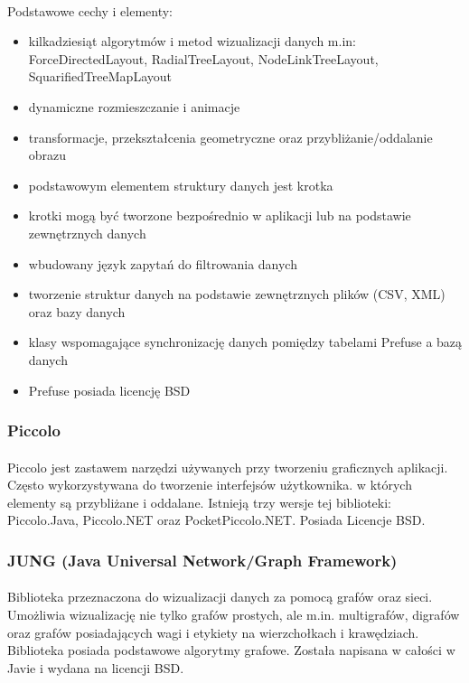 \documentclass[a4paper,10pt]{article}
\begin{document}
\paragraph{}Podstawowe cechy i elementy:
\begin{itemize}
\item kilkadziesiąt algorytmów i metod wizualizacji danych m.in: ForceDirectedLayout, RadialTreeLayout, NodeLinkTreeLayout, SquarifiedTreeMapLayout 
\item dynamiczne rozmieszczanie i animacje 
\item transformacje, przekształcenia geometryczne oraz przybliżanie/oddalanie obrazu 
\item podstawowym elementem struktury danych jest krotka 
\item krotki mogą być tworzone bezpośrednio w aplikacji lub na podstawie zewnętrznych danych
\item wbudowany język zapytań do filtrowania danych 
\item tworzenie struktur danych na podstawie zewnętrznych plików (CSV, XML) oraz bazy danych
\item klasy wspomagające synchronizację danych pomiędzy tabelami Prefuse a bazą danych
\item Prefuse posiada licencję BSD
\end{itemize}

\subsubsection{Piccolo}
\paragraph{} Piccolo jest zastawem narzędzi używanych przy tworzeniu graficznych aplikacji. Często wykorzystywana do tworzenie interfejsów użytkownika. w których elementy są przybliżane i oddalane. Istnieją trzy wersje tej biblioteki: Piccolo.Java, Piccolo.NET oraz PocketPiccolo.NET. Posiada Licencje BSD.

\subsubsection{JUNG (Java Universal Network/Graph Framework)}
\paragraph{} Biblioteka przeznaczona do wizualizacji danych za pomocą grafów oraz sieci. Umożliwia wizualizację nie tylko grafów prostych, ale m.in. multigrafów, digrafów oraz grafów posiadających wagi i etykiety na wierzchołkach i krawędziach. Biblioteka posiada podstawowe algorytmy grafowe. Została napisana w całości w Javie i wydana na licencji BSD.
\end{document}
